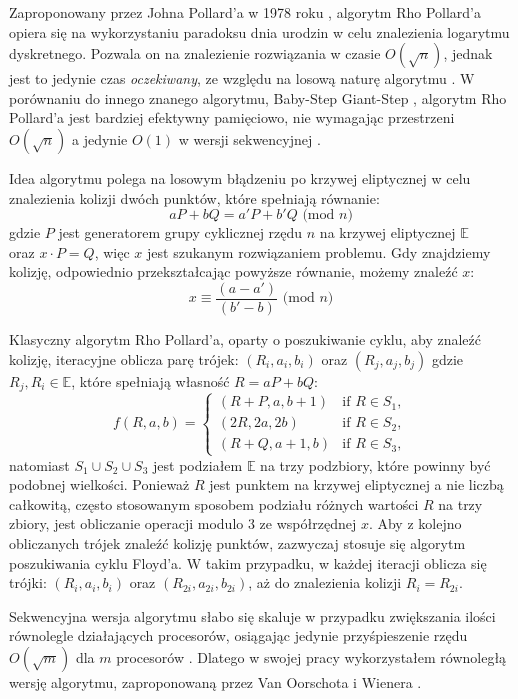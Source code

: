 Zaproponowany przez Johna Pollard'a w 1978 roku \cite{Pollard1978},
algorytm Rho Pollard'a opiera się na wykorzystaniu paradoksu dnia urodzin w celu znalezienia logarytmu dyskretnego.
Pozwala on na znalezienie rozwiązania w czasie $O(\sqrt{n})$,
jednak jest to jedynie czas \textit{oczekiwany}, ze względu na losową naturę algorytmu \cite{Blake2005}.
W porównaniu do innego znanego algorytmu, Baby-Step Giant-Step \cite{Stinson2021}, algorytm Rho Pollard'a jest bardziej
efektywny pamięciowo, nie wymagając
przestrzeni $O(\sqrt{n})$ a jedynie $O(1)$ w wersji sekwencyjnej \cite{Stinson2021}\cite{Blake2005}.
\par

Idea algorytmu polega na losowym błądzeniu po krzywej eliptycznej
w celu znalezienia kolizji dwóch punktów, które spełniają równanie:
$$
    a P + b Q = a' P + b' Q \textrm{ (mod } n)
$$
gdzie $P$ jest generatorem grupy cyklicznej rzędu $n$ na krzywej eliptycznej $\mathbb{E}$ \\
oraz $x \cdot P = Q$, więc $x$ jest szukanym rozwiązaniem problemu.
Gdy znajdziemy kolizję, odpowiednio przekształcając powyższe równanie, możemy znaleźć
$x$:
$$
    x \equiv \frac{(a-a')}{(b'-b)} \textrm{ (mod } n)
$$


Klasyczny algorytm Rho Pollard'a, oparty o poszukiwanie cyklu,
aby znaleźć kolizję, iteracyjne oblicza parę trójek:
$(R_i,a_i,b_i)$ oraz $(R_j,a_j,b_j)$ gdzie $R_j, R_i \in \mathbb{E}$, które spełniają
własność $R = a P + b Q$:
$$
    f(R,a,b) =
    \begin{cases}
        (R + P,a,b+1)     & \text{if } R \in S_1, \\
        (2R,2a, 2b)       & \text{if } R \in S_2, \\
        (R + Q, a + 1, b) & \text{if } R \in S_3,
    \end{cases}
$$
natomiast $S_1 \cup S_2 \cup S_3$ jest podziałem $\mathbb{E}$ na trzy podzbiory, które powinny być podobnej wielkości.
Ponieważ $R$ jest punktem na krzywej eliptycznej a nie liczbą całkowitą, często stosowanym sposobem
podziału różnych wartości $R$ na trzy zbiory, jest obliczanie operacji modulo $3$ ze współrzędnej $x$.
Aby z kolejno obliczanych trójek znaleźć kolizję punktów, zazwyczaj stosuje się algorytm poszukiwania cyklu Floyd'a.
W takim przypadku, w każdej iteracji oblicza się trójki: $(R_i, a_i, b_i)$ oraz $(R_{2i}, a_{2i}, b_{2i})$, aż do znalezienia
kolizji $R_i = R_{2i}$.

\par
Sekwencyjna wersja algorytmu słabo się skaluje w przypadku zwiększania ilości równolegle działających procesorów,
osiągając jedynie przyśpieszenie rzędu $O(\sqrt{m})$ dla $m$ procesorów \cite{Oorschot}.
Dlatego w swojej pracy wykorzystałem równoległą wersję algorytmu, zaproponowaną przez Van Oorschota i Wienera \cite{Oorschot}.

